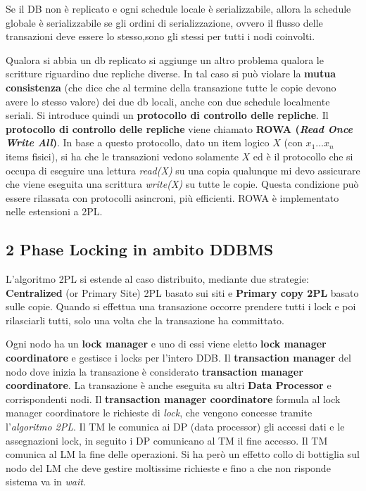 Se il DB non è replicato e ogni schedule locale è serializzabile, allora la schedule globale è serializzabile se gli ordini di serializzazione, ovvero il flusso delle transazioni deve essere lo stesso,sono gli stessi per tutti i nodi coinvolti.

Qualora si abbia un db replicato si aggiunge un altro problema qualora le scritture riguardino due repliche diverse. In tal caso si può violare la \textbf{mutua consistenza} (che dice che al termine della transazione tutte le copie devono avere lo stesso valore) dei due db locali, anche con due schedule localmente seriali. Si introduce quindi un \textbf{protocollo di controllo delle repliche}. Il \textbf{protocollo di controllo delle repliche} viene chiamato \textbf{ROWA (\textit{Read Once Write All})}. In base a questo protocollo, dato un item logico $X$ (con $x_1\ldots x_n$ items fisici), si ha che le transazioni vedono solamente $X$ ed è il protocollo che si occupa di eseguire una lettura \textit{read(X)} su una copia qualunque mi devo assicurare che viene eseguita una scrittura \textit{write(X)} su tutte le copie. Questa condizione può essere rilassata con protocolli asincroni, più efficienti. ROWA è implementato nelle estensioni a 2PL. 

\subsection{2 Phase Locking in ambito DDBMS}
L’algoritmo 2PL si estende al caso distribuito, mediante due strategie: \textbf{Centralized} (or Primary Site) 2PL basato sui siti e \textbf{Primary copy 2PL} basato sulle copie. Quando si effettua una transazione occorre prendere tutti i lock e poi rilasciarli tutti, solo una volta che la transazione ha committato.

Ogni nodo ha un \textbf{lock manager} e uno di essi viene eletto \textbf{lock manager coordinatore} e gestisce i locks per l’intero DDB. Il \textbf{transaction manager} del nodo dove inizia la transazione è considerato \textbf{transaction manager coordinatore}. La transazione è anche eseguita su altri \textbf{Data Processor} e corrispondenti nodi. Il \textbf{transaction manager coordinatore} formula al lock manager coordinatore le richieste di \textit{lock}, che vengono concesse tramite l'\textit{algoritmo 2PL}. Il TM le comunica ai DP (data processor) gli accessi dati e le assegnazioni lock, in seguito i DP comunicano al TM il fine accesso. Il TM comunica al LM la fine delle operazioni. 
Si ha però un effetto collo di bottiglia sul nodo del LM che deve gestire moltissime richieste e fino a che non risponde sistema va in \textit{wait}.

